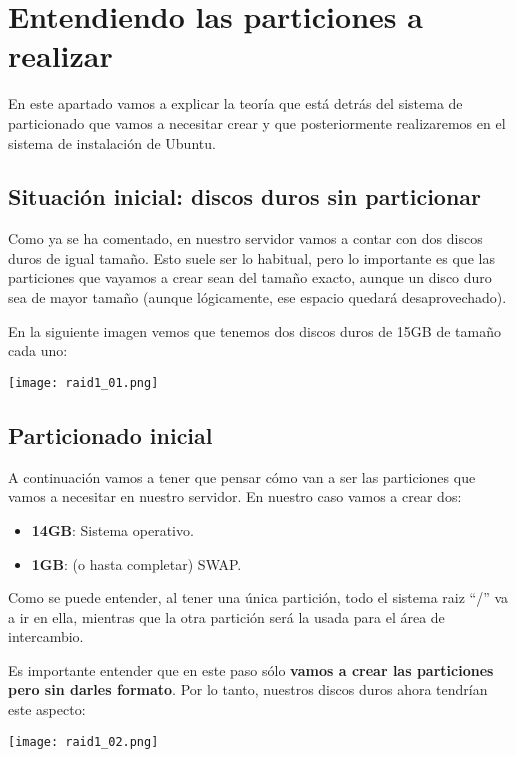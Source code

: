 \section{Entendiendo las particiones a realizar}
En este apartado vamos a explicar la teoría que está detrás del sistema de particionado que vamos a necesitar crear y que posteriormente realizaremos en el sistema de instalación de Ubuntu.

\subsection{Situación inicial: discos duros sin particionar}
Como ya se ha comentado, en nuestro servidor vamos a contar con dos discos duros de igual tamaño. Esto suele ser lo habitual, pero lo importante es que las particiones que vayamos a crear sean del tamaño exacto, aunque un disco duro sea de mayor tamaño (aunque lógicamente, ese espacio quedará desaprovechado).

En la siguiente imagen vemos que tenemos dos discos duros de 15GB de tamaño cada uno:

\begin{center}
    \vspace{-10pt}
    \texttt{[image: raid1\_01.png]}
    \vspace{-20pt}
\end{center}


\subsection{Particionado inicial}
A continuación vamos a tener que pensar cómo van a ser las particiones que vamos a necesitar en nuestro servidor. En nuestro caso vamos a crear dos:
\begin{itemize}
    \item  \textbf{14GB}: Sistema operativo.
    \item  \textbf{1GB}: (o hasta completar) SWAP.
\end{itemize}

Como se puede entender, al tener una única partición, todo el sistema raiz “/” va a ir en ella, mientras que la otra partición será la usada para el área de intercambio.

Es importante entender que en este paso sólo \textbf{vamos a crear las particiones pero sin darles formato}. Por lo tanto, nuestros discos duros ahora tendrían este aspecto:

\begin{center}
    \vspace{-10pt}
    \texttt{[image: raid1\_02.png]}
    \vspace{-20pt}
\end{center}



